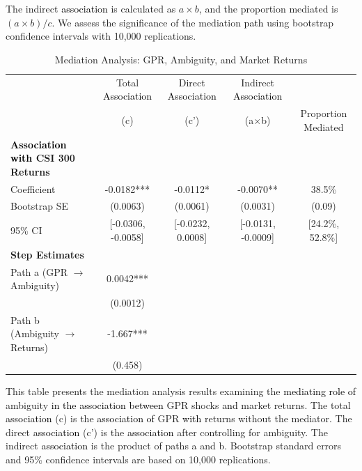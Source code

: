 \documentclass[preprint,12pt,authoryear]{elsarticle}
\begin{document}
The indirect \textcolor{black}{association} is calculated as $a \times b$, and the proportion mediated is $(a \times b) / c$. We assess the significance of the mediation \textcolor{black}{path} using bootstrap confidence intervals with 10,000 replications.

\begin{table}
\centering
\caption{Mediation Analysis: GPR, Ambiguity, and Market Returns}
\label{tab:mediation}
\begin{threeparttable}
\begin{tabular*}{\textwidth}{@{\extracolsep{\fill}} lcccc @{\extracolsep{\fill}}}
\toprule
& Total \textcolor{black}{Association} & Direct \textcolor{black}{Association} & Indirect \textcolor{black}{Association} & \\
& (c) & (c') & (a$\times$b) & Proportion Mediated \\
\midrule
\midrule
\textbf{\textcolor{black}{Association with} CSI 300 Returns} & & & & \\
Coefficient & -0.0182*** & -0.0112* & -0.0070** & 38.5\% \\
Bootstrap SE & (0.0063) & (0.0061) & (0.0031) & (0.09) \\
95\% CI & [-0.0306, -0.0058] & [-0.0232, 0.0008] & [-0.0131, -0.0009] & [24.2\%, 52.8\%] \\
\midrule
\textbf{Step Estimates} & & & & \\
Path a (GPR $\rightarrow$ Ambiguity) & 0.0042*** & & & \\
& (0.0012) & & & \\
Path b (Ambiguity $\rightarrow$ Returns) & -1.667*** & & & \\
& (0.458) & & & \\
\bottomrule
\end{tabular*}
\begin{tablenotes}[flushleft]
\small
\item[] This table presents the mediation analysis results examining the \textcolor{black}{mediating role of} ambiguity \textcolor{black}{in the association between} GPR shocks \textcolor{black}{and} market returns. The total \textcolor{black}{association} (c) is the \textcolor{black}{association of} GPR \textcolor{black}{with} returns without the mediator. The direct \textcolor{black}{association} (c') is the \textcolor{black}{association} after controlling for ambiguity. The indirect \textcolor{black}{association} is the product of paths a and b. Bootstrap standard errors and 95\% confidence intervals are based on 10,000 replications.
\end{tablenotes}
\end{threeparttable}
\end{table}
\end{document}
